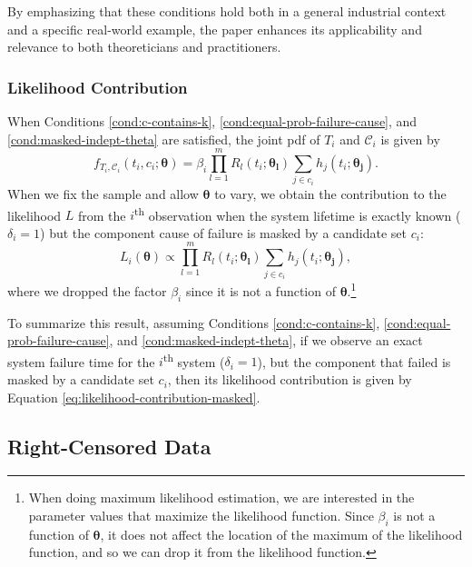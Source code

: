 \documentclass[
]{article}
\theoremstyle{definition}
\theoremstyle{plain}
\theoremstyle{definition}
\theoremstyle{definition}
\theoremstyle{definition}
\theoremstyle{definition}
\theoremstyle{remark}
\begin{document}
By emphasizing that these conditions hold both in a general industrial context
and a specific real-world example, the paper enhances its applicability and
relevance to both theoreticians and practitioners.

\hypertarget{likelihood-contribution}{%
\subsubsection*{Likelihood Contribution}\label{likelihood-contribution}}

When Conditions \ref{cond:c-contains-k}, \ref{cond:equal-prob-failure-cause},
and \ref{cond:masked-indept-theta} are satisfied, the joint pdf of \(T_i\) and
\(\mathcal{C}_i\) is given by
\[
f_{T_i,\mathcal{C}_i}(t_i,c_i;\boldsymbol{\theta}) =
    \beta_i \prod_{l=1}^m R_l(t_i;\boldsymbol{\theta_l})
    \sum_{j \in c_i} h_j(t_i;\boldsymbol{\theta_j}).
\]
When we fix the sample and allow \(\boldsymbol{\theta}\) to vary, we obtain the
contribution to the likelihood \(L\) from the \(i\)\textsuperscript{th} observation
when the system lifetime is exactly known (\(\delta_i = 1\)) but the
component cause of failure is masked by a candidate set \(c_i\):
\begin{equation}
\label{eq:likelihood-contribution-masked}
L_i(\boldsymbol{\theta}) \propto \prod_{l=1}^m R_l(t_i;\boldsymbol{\theta_l})
    \sum_{j \in c_i} h_j(t_i;\boldsymbol{\theta_j}),
\end{equation}
where we dropped the factor \(\beta_i\) since it is not a function of \(\boldsymbol{\theta}\).\footnote{When doing maximum likelihood estimation, we are interested in the
  parameter values that maximize the likelihood function. Since \(\beta_i\) is not
  a function of \(\boldsymbol{\theta}\), it does not affect the location of the maximum of the
  likelihood function, and so we can drop it from the likelihood function.}

To summarize this result, assuming Conditions \ref{cond:c-contains-k},
\ref{cond:equal-prob-failure-cause}, and \ref{cond:masked-indept-theta},
if we observe an exact system failure time for the \(i\)\textsuperscript{th}
system (\(\delta_i = 1\)), but the component that failed is masked by a
candidate set \(c_i\), then its likelihood contribution is given by Equation
\eqref{eq:likelihood-contribution-masked}.

\hypertarget{right-censored-data}{%
\subsection{Right-Censored Data}\label{right-censored-data}}
\end{document}
